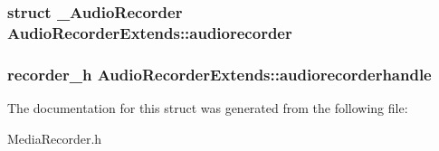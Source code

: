 \subsubsection[{audiorecorder}]{\setlength{\rightskip}{0pt plus 5cm}struct {\bf \-\_\-\-Audio\-Recorder} Audio\-Recorder\-Extends\-::audiorecorder}\label{structAudioRecorderExtends_a6db621dfa99af22b9a1f3a649d1e13c4}
\subsubsection[{audiorecorderhandle}]{\setlength{\rightskip}{0pt plus 5cm}recorder\-\_\-h Audio\-Recorder\-Extends\-::audiorecorderhandle}\label{structAudioRecorderExtends_aa26ae04fd12ea75dbfbe51164087aa7a}


The documentation for this struct was generated from the following file\-:\begin{DoxyCompactItemize}
\item 
Media\-Recorder.\-h\end{DoxyCompactItemize}
